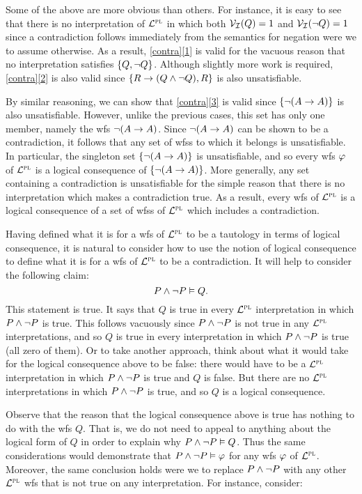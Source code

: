 Some of the above are more obvious than others.
For instance, it is easy to see that there is no interpretation of $\mathcal{L}^{\textsc{pl}}$ in which both $\mathcal{V}_{\mathcal{I}}(Q) = 1$ and $\mathcal{V}_{\mathcal{I}}(\neg Q) = 1$ since a contradiction follows immediately from the semantics for negation were we to assume otherwise.
As a result, \ref{contra}\ref{1} is valid for the vacuous reason that no interpretation satisfies $\lbrace Q, \neg Q\rbrace$.
Although slightly more work is required, \ref{contra}\ref{2} is also valid since $\lbrace R \rightarrow (Q \wedge \neg Q), R\rbrace$ is also unsatisfiable.

By similar reasoning, we can show that \ref{contra}\ref{3} is valid since $\lbrace\neg (A \rightarrow A)\rbrace$ is also unsatisfiable. 
However, unlike the previous cases, this set has only one member, namely the wfs $\neg (A \rightarrow A)$.
Since $\neg (A \rightarrow A)$ can be shown to be a contradiction, it follows that any set of wfss to which it belongs is unsatisfiable.
In particular, the singleton set $\lbrace\neg (A \rightarrow A)\rbrace$ is unsatisfiable, and so every wfs $\varphi$ of $\mathcal{L}^{\textsc{pl}}$ is a logical consequence of $\lbrace\neg (A \rightarrow A)\rbrace$. 
More generally, any set containing a contradiction is unsatisfiable for the simple reason that there is no interpretation which makes a contradiction true.
As a result, every wfs of $\mathcal{L}^{\textsc{pl}}$ is a logical consequence of a set of wfss of $\mathcal{L}^{\textsc{pl}}$ which includes a contradiction. 


Having defined what it is for a wfs of $\mathcal{L}^{\textsc{pl}}$ to be a tautology in terms of logical consequence, it is natural to consider how to use the notion of logical consequence to define what it is for a wfs of $\mathcal{L}^{\textsc{pl}}$ to be a contradiction.
It will help to consider the following claim:
  $$P \wedge \neg P \vDash Q.$$
This statement is true.
It says that $Q$ is true in every $\mathcal{L}^{\textsc{pl}}$ interpretation in which $P \wedge \neg P$ is true.
This follows vacuously since $P \wedge \neg P$ is not true in any $\mathcal{L}^{\textsc{pl}}$ interpretations, and so $Q$ is true in every interpretation in which $P \wedge \neg P$ is true (all zero of them).
Or to take another approach, think about what it would take for the logical consequence above to be false: there would have to be a $\mathcal{L}^{\textsc{pl}}$ interpretation in which $P \wedge \neg P$ is true and $Q$ is false.
But there are no $\mathcal{L}^{\textsc{pl}}$ interpretations in which $P \wedge \neg P$ is true, and so $Q$ is a logical consequence.

Observe that the reason that the logical consequence above is true has nothing to do with the wfs $Q$.
That is, we do not need to appeal to anything about the logical form of $Q$ in order to explain why $P \wedge \neg P \vDash Q$. 
Thus the same considerations would demonstrate that $P \wedge \neg P \vDash \varphi$ for any wfs $\varphi$ of $\mathcal{L}^{\textsc{pl}}$.
Moreover, the same conclusion holds were we to replace $P \wedge \neg P$ with any other $\mathcal{L}^{\textsc{pl}}$ wfs that is not true on any interpretation.
For instance, consider:

